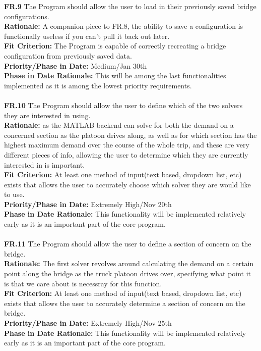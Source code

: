 \documentclass[12pt]{article}
\begin{document}
  \noindent\textbf{FR.9} The Program should allow the user to load in their previously saved bridge configurations.\\
  \textbf{Rationale:} A companion piece to FR.8, the ability to save a configuration is functionally useless if you can't pull it back out later.\\
  \textbf{Fit Criterion:} The Program is capable of correctly recreating a bridge configuration from previously saved data.\\
  \textbf{Priority/Phase in Date:} Medium/Jan 30th\\
  \textbf{Phase in Date Rationale:} This will be among the last functionalities implemented as it is among the lowest priority requirements.\\\\

  \noindent\textbf{FR.10} The Program should allow the user to define which of the two solvers they are interested in using.\\
  \textbf{Rationale:} as the MATLAB backend can solve for both the demand on a concerned section as the platoon drives along, as well as for which section has the 
  highest maximum demand over the course of the whole trip, and these are very different pieces of info, allowing the user to determine which they are currently interested in 
  is important.\\
  \textbf{Fit Criterion:} At least one method of input(text based, dropdown list, etc) exists that allows the user to accurately choose which solver they are would like to use.\\
  \textbf{Priority/Phase in Date:} Extremely High/Nov 20th\\
  \textbf{Phase in Date Rationale:} This functionality will be implemented relatively early as it is an important part of the core program.\\\\

  \noindent\textbf{FR.11} The Program should allow the user to define a section of concern on the bridge.\\
  \textbf{Rationale:} The first solver revolves around calculating the demand on a certain point along the bridge as the truck platoon drives over, specifying what point it is
  that we care about is necessray for this function.\\
  \textbf{Fit Criterion:} At least one method of input(text based, dropdown list, etc) exists that allows the user to accurately determine a section of concern on the bridge.\\
  \textbf{Priority/Phase in Date:} Extremely High/Nov 25th\\
  \textbf{Phase in Date Rationale:} This functionality will be implemented relatively early as it is an important part of the core program.\\\\
\end{document}
